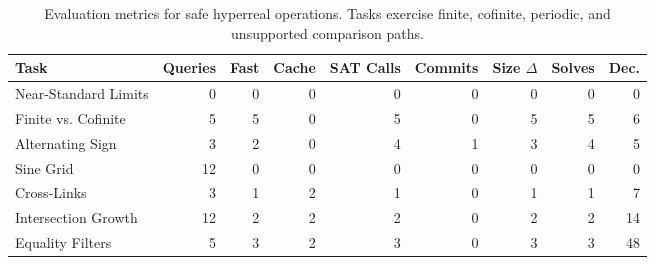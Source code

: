\begin{table}[t]
\centering
\footnotesize
\begin{tabular}{lrrrrrrrr}
\hline
Task & Queries & Fast & Cache & SAT Calls & Commits & Size $\Delta$ & Solves & Dec. \\ \hline
Near-Standard Limits & 0 & 0 & 0 & 0 & 0 & 0 & 0 & 0 \\
Finite vs. Cofinite & 5 & 5 & 0 & 5 & 0 & 5 & 5 & 6 \\
Alternating Sign & 3 & 2 & 0 & 4 & 1 & 3 & 4 & 5 \\
Sine Grid & 12 & 0 & 0 & 0 & 0 & 0 & 0 & 0 \\
Cross-Links & 3 & 1 & 2 & 1 & 0 & 1 & 1 & 7 \\
Intersection Growth & 12 & 2 & 2 & 2 & 0 & 2 & 2 & 14 \\
Equality Filters & 5 & 3 & 2 & 3 & 0 & 3 & 3 & 48 \\
\hline
\end{tabular}
\caption{Evaluation metrics for safe hyperreal operations. Tasks exercise finite, cofinite, periodic, and unsupported comparison paths.}
\label{tab:metrics}
\end{table}
